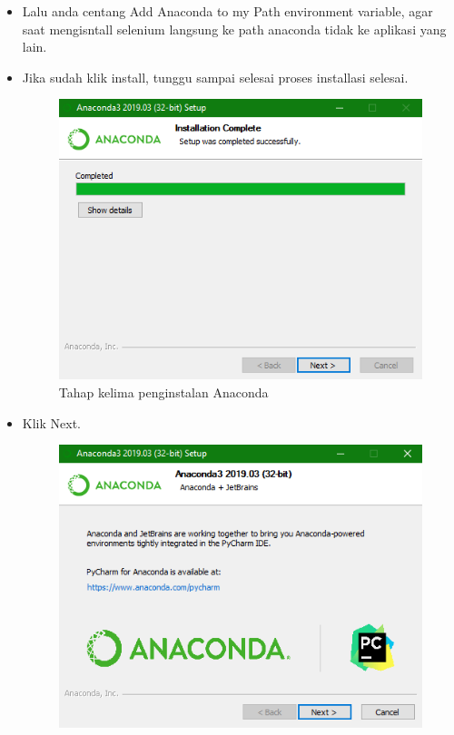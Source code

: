 \begin{enumerate}
\begin{itemize}
\begin{figure}[!htbp]
\end{figure}
\item Lalu anda centang Add Anaconda to my Path environment variable, agar saat mengisntall selenium langsung ke path anaconda tidak ke aplikasi yang lain.
\item Jika sudah klik install, tunggu sampai selesai proses installasi selesai.
\begin{figure}[!htbp]
\centering
\includegraphics[scale=0.7]{figures/C5.png}
\caption{Tahap kelima penginstalan Anaconda}
\end{figure}
\item Klik Next.
\begin{figure}[!htbp]
\centering
\includegraphics[scale=0.7]{figures/C6.png}

\end{figure}
\end{itemize}
\end{enumerate}
